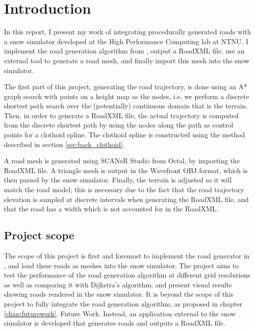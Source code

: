 \chapter{Introduction}
\label{chap:introduction}
In this report, I present my work of integrating procedurally generated roads with a snow simulator developed at the High Performance Computing lab at NTNU. I implement the road generation algorithm from \cite{roadgen}, output a RoadXML file\cite{roadxml}, use an external tool to generate a road mesh, and finally import this mesh into the snow simulator. 

The first part of this project, generating the road trajectory, is done using an A* graph search with points on a height map as the nodes, i.e. we perform a discrete shortest path search over the (potentially) continuous domain that is the terrain. Then, in order to generate a RoadXML file, the actual trajectory is computed from the discrete shortest path by using the nodes along the path as control points for a clothoid spline. The clothoid spline is constructed using the method described in section \ref{sec:back_clothoid}.

A road mesh is generated using SCANeR Studio from Octal, by importing the RoadXML file. A triangle mesh is output in the Wavefront OBJ format, which is then parsed by the snow simulator. Finally, the terrain is adjusted so it will match the road model; this is necessary due to the fact that the road trajectory elevation is sampled at discrete intervals when generating the RoadXML file, and that the road has a width which is not accounted for in the RoadXML.

\section{Project scope}
\label{sec:project-scope} 
The scope of this project is first and foremost to implement the road generator in \cite{roadgen}, and load these roads as meshes into the snow simulator. The project aims to test the performance of the road generation algorithm at different grid resolutions as well as comparing it with Dijkstra's algorithm, and present visual results showing roads rendered in the snow simulator. It is beyond the scope of this project to fully integrate the road generation algorithm, as proposed in chapter \ref{chap:futurework}, Future Work. Instead, an application external to the snow simulator is developed that generates roads and outputs a RoadXML file.

